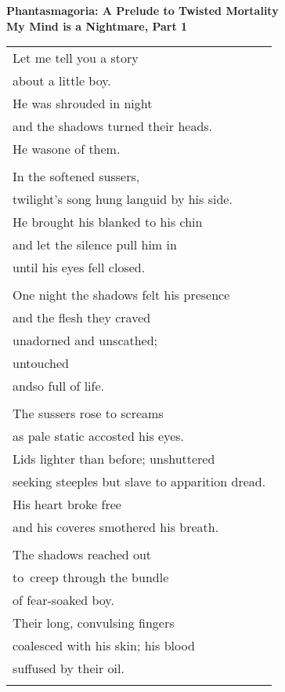 \documentclass{article}
\begin{document}
\begin{center}
\textbf{Phantasmagoria: A Prelude to Twisted Mortality} \\
{\small\textbf{My Mind is a Nightmare, Part 1}} \\
\vspace*{2ex}
\begin{tabular}{l}
Let me tell you a story \\
about a little boy. \\
He was shrouded in night \\
and the shadows turned their heads. \\
He was\hspace*{4ex}one of them. \\
\\
In the softened sussers, \\
twilight's song hung languid by his side. \\
He brought his blanked to his chin \\
and let the silence pull him in \\
until his eyes fell closed. \\
\\
One night the shadows felt his presence \\
and the flesh they craved \\
unadorned and unscathed; \\
untouched \\
and\hspace*{4ex}so full of life. \\
\\
The sussers rose to screams \\
as pale static accosted his eyes. \\
Lids lighter than before; unshuttered \\
seeking steeples but slave to apparition dread. \\
His heart broke free \\
and his coveres smothered his breath. \\
\\
The shadows reached out \\
to creep through the bundle \\
of fear-soaked boy.  \\
Their long, convulsing fingers \\
coalesced with his skin; his blood \\
suffused by their oil. \\
\\

\end{tabular}
\end{center}
\end{document}
